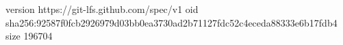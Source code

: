 version https://git-lfs.github.com/spec/v1
oid sha256:92587f0fcb2926979d03bb0ea3730ad2b71127fdc52c4eceda88333e6b17fdb4
size 196704
